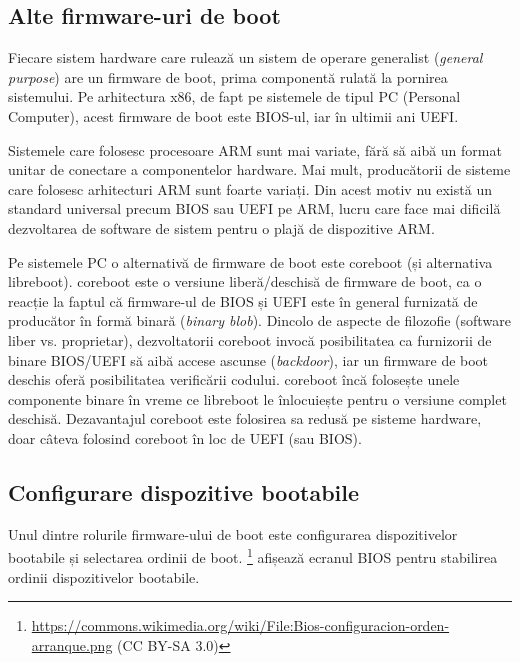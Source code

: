 \subsection{Alte firmware-uri de boot}
\label{sec:boot:other}

Fiecare sistem hardware care rulează un sistem de operare generalist (\textit{general
purpose}) are un firmware de boot, prima componentă rulată la pornirea
sistemului. Pe arhitectura x86, de fapt pe sistemele de tipul PC (Personal
Computer), acest firmware de boot este BIOS-ul, iar în ultimii ani UEFI.

Sistemele care folosesc procesoare ARM sunt mai variate, fără să aibă un format
unitar de conectare a componentelor hardware. Mai mult, producătorii de sisteme
care folosesc arhitecturi ARM sunt foarte variați. Din acest motiv nu există un
standard universal precum BIOS sau UEFI pe ARM, lucru care face mai dificilă
dezvoltarea de software de sistem pentru o plajă de dispozitive ARM.

Pe sistemele PC o alternativă de firmware de boot este coreboot (și alternativa
libreboot). coreboot este o versiune liberă/deschisă de firmware de boot, ca o
reacție la faptul că firmware-ul de BIOS și UEFI este în general furnizată de producător în
formă binară (\textit{binary blob}). Dincolo de aspecte de filozofie (software liber vs.
proprietar), dezvoltatorii coreboot invocă posibilitatea ca furnizorii de binare
BIOS/UEFI să aibă accese ascunse (\textit{backdoor}), iar un firmware de boot deschis
oferă posibilitatea verificării codului. coreboot încă folosește unele
componente binare în vreme ce libreboot le înlocuiește pentru o versiune complet
deschisă. Dezavantajul coreboot este folosirea sa redusă pe sisteme hardware,
doar câteva folosind coreboot în loc de UEFI (sau BIOS).

\subsection{Configurare dispozitive bootabile}
\label{sec:boot:device-config}

Unul dintre rolurile firmware-ului de boot este configurarea dispozitivelor
bootabile și selectarea ordinii de boot. \footnote{\url{https://commons.wikimedia.org/wiki/File:Bios-configuracion-orden-arranque.png} (CC BY-SA 3.0)} afișează ecranul BIOS
pentru stabilirea ordinii dispozitivelor bootabile.

